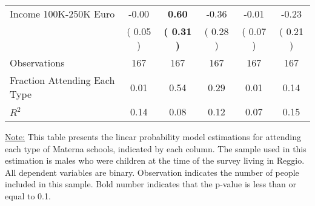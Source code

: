 \begin{table}[H]
{\begin{tabular}{lccccc}
\quad Income 100K-250K Euro &     -0.00 & \textbf{     0.60} &     -0.36 &     -0.01 &     -0.23 \\
\quad  & (     0.05 ) & \textbf{(     0.31 )}  & (     0.28 )  & (     0.07 ) & (     0.21 ) \\
\midrule
Observations & 167 & 167 & 167 & 167 & 167 \\
Fraction Attending Each Type &      0.01 &      0.54 &      0.29 &      0.01 &      0.14 \\
\midrule
$ R^2$ &      0.14 &      0.08 &      0.12 &      0.07 &      0.15 \\
\bottomrule
\end{tabular}}
\end{table}
\begin{footnotesize}
\noindent\underline{Note:} This table presents the linear probability model estimations for attending each type of Materna schools, indicated by each column. The sample used in this estimation is males who were children at the time of the survey living in Reggio. All dependent variables are binary. Observation indicates the number of people included in this sample. Bold number indicates that the p-value is less than or equal to 0.1.
\end{footnotesize}
